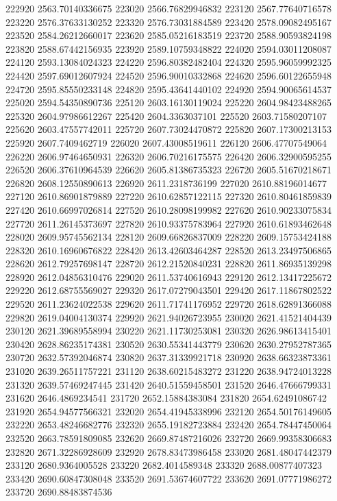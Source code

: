 {222920 2563.70140336675
223020 2566.76829946832
223120 2567.77640716578
223220 2576.37633130252
223320 2576.73031884589
223420 2578.09082495167
223520 2584.26212660017
223620 2585.05216183519
223720 2588.90593824198
223820 2588.67442156935
223920 2589.10759348822
224020 2594.03011208087
224120 2593.13084024323
224220 2596.80382482404
224320 2595.96059992325
224420 2597.69012607924
224520 2596.90010332868
224620 2596.60122655948
224720 2595.85550233148
224820 2595.43641440102
224920 2594.90065614537
225020 2594.54350890736
225120 2603.16130119024
225220 2604.98423488265
225320 2604.97986612267
225420 2604.3363037101
225520 2603.71580207107
225620 2603.47557742011
225720 2607.73024470872
225820 2607.17300213153
225920 2607.7409462719
226020 2607.43008519611
226120 2606.47707549064
226220 2606.97464650931
226320 2606.70216175575
226420 2606.32900595255
226520 2606.37610964539
226620 2605.81386735323
226720 2605.51670218671
226820 2608.12550890613
226920 2611.2318736199
227020 2610.88196014677
227120 2610.86901879889
227220 2610.62857122115
227320 2610.80461859839
227420 2610.66997026814
227520 2610.28098199982
227620 2610.90233075834
227720 2611.26145373697
227820 2610.93375783964
227920 2610.61893462648
228020 2609.95745562134
228120 2609.66826837009
228220 2609.15753424188
228320 2610.16960676822
228420 2613.42603464287
228520 2613.23497506865
228620 2612.79257698147
228720 2612.21520840231
228820 2611.86935139298
228920 2612.04856310476
229020 2611.53740616943
229120 2612.13417225672
229220 2612.68755569027
229320 2617.07279043501
229420 2617.11867802522
229520 2611.23624022538
229620 2611.71741176952
229720 2618.62891366088
229820 2619.04004130374
229920 2621.94026723955
230020 2621.41521404439
230120 2621.39689558994
230220 2621.11730253081
230320 2626.98613415401
230420 2628.86235174381
230520 2630.55341443779
230620 2630.27952787365
230720 2632.57392046874
230820 2637.31339921718
230920 2638.66323873361
231020 2639.26511757221
231120 2638.60215483272
231220 2638.94724013228
231320 2639.57469247445
231420 2640.51559458501
231520 2646.47666799331
231620 2646.4869234541
231720 2652.15884383084
231820 2654.62491086742
231920 2654.94577566321
232020 2654.41945338996
232120 2654.50176149605
232220 2653.48246682776
232320 2655.19182723884
232420 2654.78447450064
232520 2663.78591809085
232620 2669.87487216026
232720 2669.99358306683
232820 2671.32286928609
232920 2678.83473986458
233020 2681.48047442379
233120 2680.9364005528
233220 2682.4014589348
233320 2688.00877407323
233420 2690.60847308048
233520 2691.53674607722
233620 2691.07771986272
233720 2690.88483874536
}
